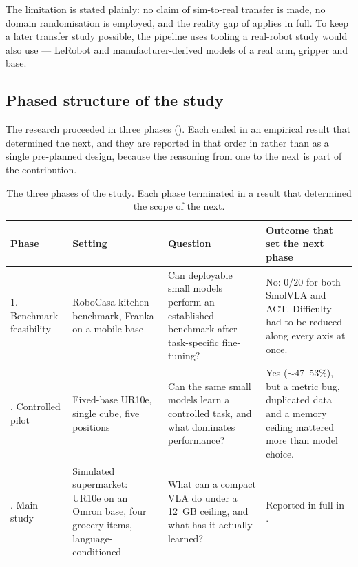 The limitation is stated plainly: no claim of sim-to-real transfer is made, no domain
randomisation is employed, and the reality gap of  applies in full.
To keep a later transfer study possible, the pipeline uses tooling a real-robot study
would also use --- LeRobot \parencite{cadene2024lerobot} and manufacturer-derived models
of a real arm, gripper and base.

\subsection{Phased structure of the study}
\label{sec:m-phases}
The research proceeded in three phases (). Each ended in an
empirical result that determined the next, and they are reported in that order in
 rather than as a single pre-planned design, because the
reasoning from one to the next is part of the contribution.

\begin{table}[ht]
\caption{The three phases of the study. Each phase terminated in a result that
determined the scope of the next.}
\begin{center}
\begin{tabular}{p{}p{}p{}p{}}
\toprule
Phase & Setting & Question & Outcome that set the next phase \\
\midrule
1. Benchmark feasibility &
RoboCasa kitchen benchmark, Franka on a mobile base &
Can deployable small models perform an established benchmark after task-specific
fine-tuning? &
No: 0/20 for both SmolVLA and ACT. Difficulty had to be reduced along every axis at
once. \\
\addlinespace
2. Controlled pilot &
Fixed-base UR10e, single cube, five positions &
Can the same small models learn a controlled task, and what dominates performance? &
Yes ($\sim$47--53\%), but a metric bug, duplicated data and a memory ceiling
mattered more than model choice. \\
\addlinespace
3. Main study &
Simulated supermarket: UR10e on an Omron base, four grocery items, language-conditioned &
What can a compact VLA do under a \SI{12}{GB} ceiling, and what has it actually
learned? &
Reported in full in {chap:results}. \\
\bottomrule
\end{tabular}
\end{center}
\label{tab:phases-study}
\end{table}


